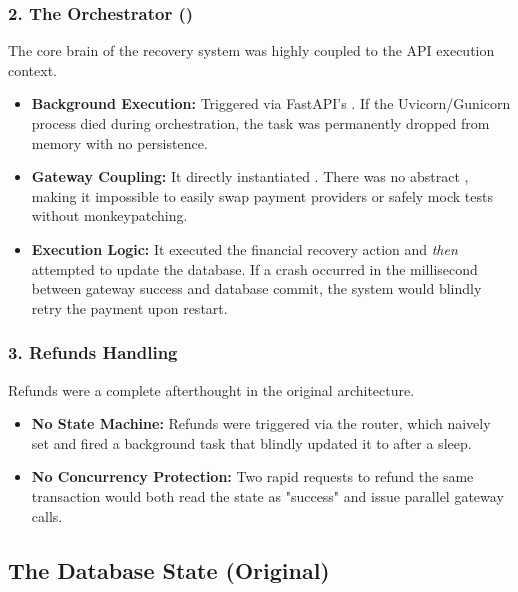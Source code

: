 \subsubsection{2. The Orchestrator ()}
The core brain of the recovery system was highly coupled to the API execution context.
\begin{itemize}
    \item \textbf{Background Execution:} Triggered via FastAPI's . If the Uvicorn/Gunicorn process died during orchestration, the task was permanently dropped from memory with no persistence.
    \item \textbf{Gateway Coupling:} It directly instantiated . There was no abstract , making it impossible to easily swap payment providers or safely mock tests without monkeypatching.
    \item \textbf{Execution Logic:} It executed the financial recovery action and \textit{then} attempted to update the database. If a crash occurred in the millisecond between gateway success and database commit, the system would blindly retry the payment upon restart.
\end{itemize}

\vspace{0.4cm}

\subsubsection{3. Refunds Handling}
Refunds were a complete afterthought in the original architecture.
\begin{itemize}
    \item \textbf{No State Machine:} Refunds were triggered via the router, which naively set  and fired a background task that blindly updated it to  after a sleep.
    \item \textbf{No Concurrency Protection:} Two rapid requests to refund the same transaction would both read the state as "success" and issue parallel gateway calls.
\end{itemize}

\vspace{0.8cm}

\subsection{The Database State (Original)}


